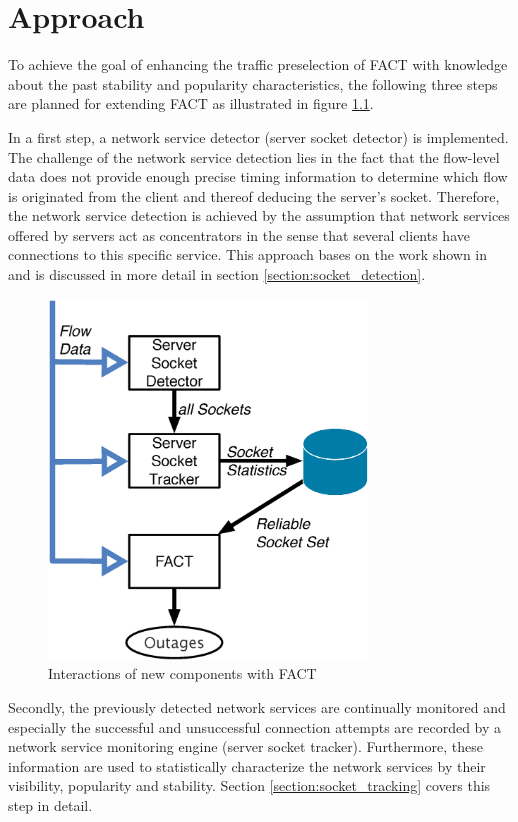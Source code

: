 

\chapter{Approach
\label{chapter:approach}}

To achieve the goal of enhancing the traffic preselection of \gls{FACT} with
knowledge about the past stability and popularity characteristics, the following
three steps are planned for extending \gls{FACT} as illustrated in figure 
\ref{fig:FACT}.

In a first step, a network service detector (server socket detector) is 
implemented. The challenge of the network service detection lies in the fact 
that the flow-level data does not provide enough precise timing information to 
determine which flow is originated from the client and thereof deducing the 
server's socket\citep{Trammell}. Therefore, the network service detection is 
achieved by the assumption that network services offered by servers act as 
concentrators in the sense that several clients have connections to this 
specific service. This approach bases on the work shown in 
\cite{Schatzmann:Dissection, Schatzmann:Mining, Schatzmann:Tracing} and is 
discussed in more detail in section \ref{section:socket_detection}.

\begin{figure}
	[t] \centering
	\includegraphics[width=8.5cm]{images/Approach_blockdiagram.eps}
	\caption{Interactions of new components with \gls{FACT}} 
	\label{fig:FACT} 
\end{figure}

Secondly, the previously detected network services are continually monitored and
especially the successful and unsuccessful connection attempts are recorded by
a network service monitoring engine (server socket tracker).
Furthermore, these information are used to statistically characterize the 
network services by their visibility, popularity and stability. Section 
\ref{section:socket_tracking} covers this step in detail.

